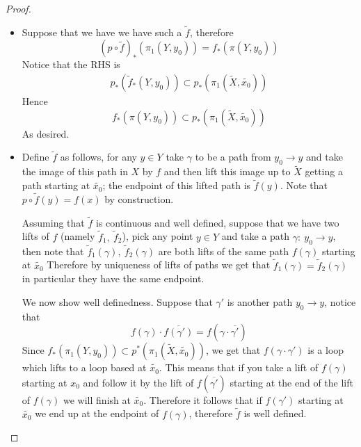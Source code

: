 \documentclass[11pt,a4paper]{article}
\theoremstyle{definition}
\theoremstyle{plain}
\theoremstyle{remark}
\newcommand{\1}{\mathbbm{1}}
\begin{document}
\begin{proof}
    \begin{itemize}
        \item[$\implies$] Suppose that we have we have such a $\tilde{f}$, therefore 
        $$(p \circ \tilde{f})_* (\pi_1(Y,y_0)) = f_*(\pi(Y,y_0))$$
        Notice that the RHS is 
        \begin{align*}
            p_*(\tilde{f}_*(Y, y_0)) \subset p_*(\pi_1(\tilde{X}, \tilde{x_0}))
        \end{align*}
        Hence 
        $$f_*(\pi(Y,y_0)) \subset p_*(\pi_1(\tilde{X}, \tilde{x_0}))$$
        As desired. 

        \item[$\impliedby$] Define $\tilde{f}$ as follows, for any $y \in Y$ take $\gamma$ to be a path from $y_0 \to y$ and take the image 
        of this path in $X$ by $f$ and then lift this image up to $\tilde{X}$ getting a path starting at $\tilde{x_0}$; the endpoint of this lifted path 
        is $\tilde{f}(y)$. Note that $p \circ \tilde{f} (y) = f(x)$ by construction. 

        Assuming that $\tilde{f}$ is continuous and well defined, suppose that we have two lifts of $f$ (namely $\tilde{f}_1, \ \tilde{f}_2$), 
        pick any point $y \in Y$ and take a path $\gamma \colon \ y_0 \to y$, then note that $\tilde{f}_1(\gamma), \ \tilde{f}_2(\gamma)$ are both lifts 
        of the same path $f(\gamma)$ starting at $\tilde{x_0}$ Therefore by uniqueness of lifts of paths we get that $\tilde{f}_1 (\gamma) = \tilde{f}_2 (\gamma)$ in particular they have the 
        same endpoint.
        
        We now show well definedness. Suppose that ${\gamma}'$ is another path $y_0 \to y$, notice that 
        $$f(\gamma) \cdot \overline{f(\gamma')} = f(\gamma \cdot \overline{\gamma'})$$ 
        Since $f_*(\pi_1(Y,y_0)) \subset p^*(\pi_1(\tilde{X}, \tilde{x_0}))$, we get that 
        $f(\gamma \cdot \gamma')$ is a loop which lifts to a loop based at $\tilde{x_0}$. This means that if you take a lift 
        of $f(\gamma)$ starting at $x_0$ and follow it by the lift of $f(\overline{\gamma'})$ starting at the end of the lift of 
        $f(\gamma)$ we will finish at $\tilde{x_0}$. Therefore it follows that if $f(\gamma')$ starting at $\tilde{x_0}$ we end up at the 
        endpoint of $f(\gamma)$, therefore $\tilde{f}$ is well defined. 


\end{itemize}
\end{proof}
\end{document}
